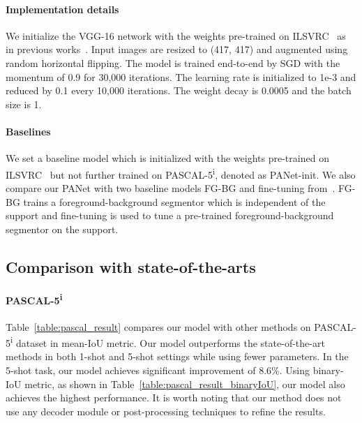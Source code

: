 \documentclass[10pt,twocolumn,letterpaper]{article}
\begin{document}
\vspace{-12pt}
\paragraph{Implementation details} We initialize the VGG-16 network with the weights pre-trained on ILSVRC~\cite{ILSVRC15} as in previous works~\cite{shaban2017one, dong2018few, zhang2018sg}. Input images are resized to (417, 417) and augmented using random horizontal flipping. The model is trained end-to-end by SGD with the momentum of 0.9 for 30,000 iterations. The learning rate is initialized to 1e-3 and reduced by 0.1 every 10,000 iterations. The weight decay is 0.0005 and the batch size is 1.

\vspace{-11pt}
\paragraph{Baselines} We set a baseline model which is initialized with the weights pre-trained on ILSVRC~\cite{ILSVRC15} but not further trained on PASCAL-5\textsuperscript{i}, denoted as PANet-init. We also compare our PANet with two baseline models FG-BG and fine-tuning from~\cite{rakelly2018conditional}. FG-BG trains a foreground-background segmentor which is independent of the support and fine-tuning is used to tune a pre-trained foreground-background segmentor on the support.

\subsection{Comparison with state-of-the-arts}

\paragraph{PASCAL-5\textsuperscript{i}} Table~\ref{table:pascal_result} compares our model with other methods on PASCAL-5\textsuperscript{i} dataset in mean-IoU metric. Our model outperforms the state-of-the-art methods in both 1-shot and 5-shot settings while using fewer parameters. In the 5-shot task, our model achieves significant improvement of 8.6\%.  Using binary-IoU metric, as shown in Table~\ref{table:pascal_result_binaryIoU}, our model also achieves the highest performance. It is worth noting that our method does not use any decoder module or post-processing techniques to refine the results.
\end{document}
